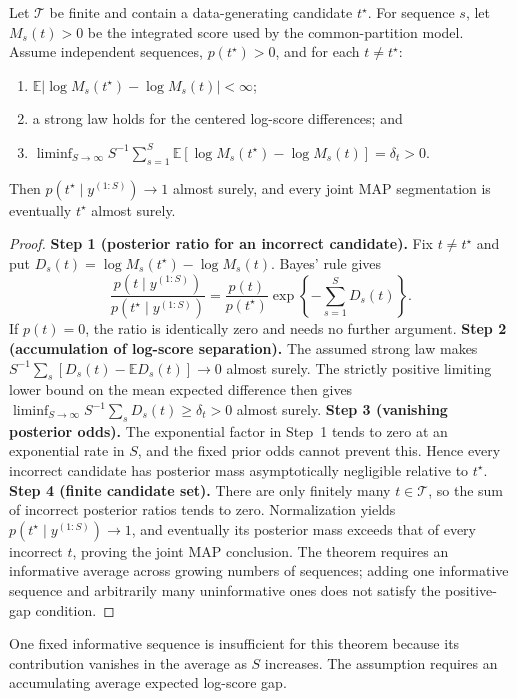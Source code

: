 \begin{theorem}
\label{thm:shared-consistency-paper}
Let $\mathcal T$ be finite and contain a data-generating candidate $t^\star$. For sequence $s$, let $M_s(t)>0$ be the integrated score used by the common-partition model. Assume independent sequences, $p(t^\star)>0$, and for each $t\ne t^\star$:
\begin{enumerate}
\item $\mathbb E|\log M_s(t^\star)-\log M_s(t)|<\infty$;
\item a strong law holds for the centered log-score differences; and
\item $\liminf_{S\to\infty}S^{-1}\sum_{s=1}^{S}\mathbb E[\log M_s(t^\star)-\log M_s(t)]=\delta_t>0$.
\end{enumerate}
Then $p(t^\star\mid y^{(1:S)})\to1$ almost surely, and every joint MAP segmentation is eventually $t^\star$ almost surely.
\end{theorem}
\begin{proof}
\textbf{Step 1 (posterior ratio for an incorrect candidate).}
Fix $t\ne t^\star$ and put $D_s(t)=\log M_s(t^\star)-\log M_s(t)$. Bayes' rule gives
\[
\frac{p(t\mid y^{(1:S)})}{p(t^\star\mid y^{(1:S)})}
=\frac{p(t)}{p(t^\star)}\exp\!\left\{-\sum_{s=1}^{S}D_s(t)\right\}.
\]
If $p(t)=0$, the ratio is identically zero and needs no further argument.
\textbf{Step 2 (accumulation of log-score separation).}
The assumed strong law makes $S^{-1}\sum_s[D_s(t)-\mathbb ED_s(t)]\to0$ almost surely. The strictly positive limiting lower bound on the mean expected difference then gives $\liminf_{S\to\infty}S^{-1}\sum_sD_s(t)\ge\delta_t>0$ almost surely.
\textbf{Step 3 (vanishing posterior odds).}
The exponential factor in Step~1 tends to zero at an exponential rate in $S$, and the fixed prior odds cannot prevent this. Hence every incorrect candidate has posterior mass asymptotically negligible relative to $t^\star$.
\textbf{Step 4 (finite candidate set).}
There are only finitely many $t\in\mathcal T$, so the sum of incorrect posterior ratios tends to zero. Normalization yields $p(t^\star\mid y^{(1:S)})\to1$, and eventually its posterior mass exceeds that of every incorrect $t$, proving the joint MAP conclusion. The theorem requires an informative average across growing numbers of sequences; adding one informative sequence and arbitrarily many uninformative ones does not satisfy the positive-gap condition.
\end{proof}

One fixed informative sequence is insufficient for this theorem because its contribution vanishes in the average as $S$ increases. The assumption requires an accumulating average expected log-score gap.

